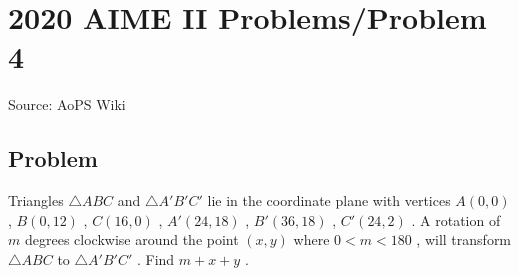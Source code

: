 \documentclass[12pt]{article}
\begin{document}
\section*{{2020 AIME II Problems/Problem 4}}
Source: AoPS Wiki

\subsection*{Problem}
Triangles $\triangle ABC$ and $\triangle A'B'C'$ lie in the coordinate plane with vertices $A(0,0)$ , $B(0,12)$ , $C(16,0)$ , $A'(24,18)$ , $B'(36,18)$ , $C'(24,2)$ . A rotation of $m$ degrees clockwise around the point $(x,y)$ where $0<m<180$ , will transform $\triangle ABC$ to $\triangle A'B'C'$ . Find $m+x+y$ .
\end{document}
